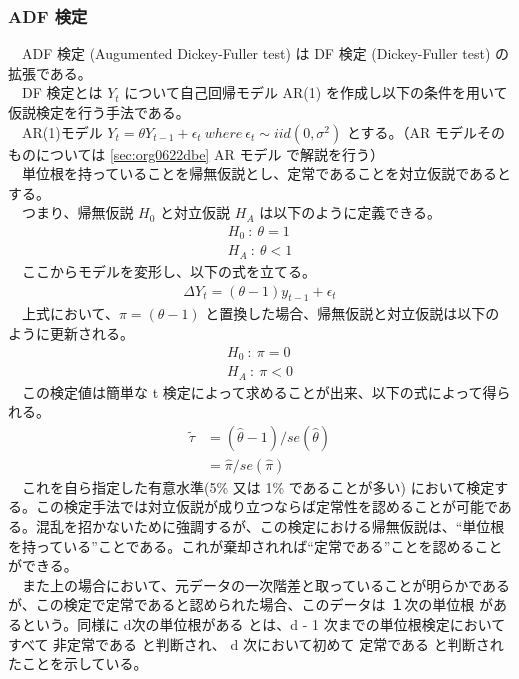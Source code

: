 \documentclass{scrartcl}
\begin{document}
\newpage
\subsubsection{ADF 検定}
\label{sec:org509e8ed}
　ADF 検定 (Augumented Dickey-Fuller test) は DF 検定 (Dickey-Fuller test) の拡張である。\\
　DF 検定とは \(Y_t\) について自己回帰モデル AR(1) を作成し以下の条件を用いて仮説検定を行う手法である。\\
　AR(1)モデル \(Y_t = \theta Y_{t-1} + \epsilon_t \  where \ \epsilon_t \sim iid(0, \sigma^2)\) とする。（AR モデルそのものについては \ref{sec:org0622dbe} AR モデル で解説を行う）\\
　単位根を持っていることを帰無仮説とし、定常であることを対立仮説であるとする。\\
　つまり、帰無仮説 \(H_0\) と対立仮説 \(H_A\) は以下のように定義できる。\\
\begin{align}
H_0\ :\ \theta = 1 \\
H_A\ :\ \theta < 1
\end{align}
　ここからモデルを変形し、以下の式を立てる。\\
\begin{align}
\Delta Y_t = (\theta - 1) y_{t-1} + \epsilon_t   
\end{align}
　上式において、\(\pi = (\theta - 1)\) と置換した場合、帰無仮説と対立仮説は以下のように更新される。\\
\begin{align}
H_0\ :\ \pi = 0 \\
H_A\ :\ \pi < 0
\end{align}
　この検定値は簡単な t 検定によって求めることが出来、以下の式によって得られる。\\
    \begin{align}
\widetilde{\tau} &= (\hat{\theta} - 1) / {se(\hat{\theta})} \nonumber \\ 
                 &= \hat{\pi} / se(\hat{\pi})
    \end{align}
　これを自ら指定した有意水準(5\% 又は 1\% であることが多い) において検定する。この検定手法では対立仮説が成り立つならば定常性を認めることが可能である。混乱を招かないために強調するが、この検定における帰無仮説は、``単位根を持っている''ことである。これが棄却されれば``定常である''ことを認めることができる。\\
　また上の場合において、元データの一次階差と取っていることが明らかであるが、この検定で定常であると認められた場合、このデータは １次の単位根 があるという。同様に d次の単位根がある とは、d - 1 次までの単位根検定においてすべて 非定常である と判断され、 d 次において初めて 定常である と判断されたことを示している。\\
\end{document}
